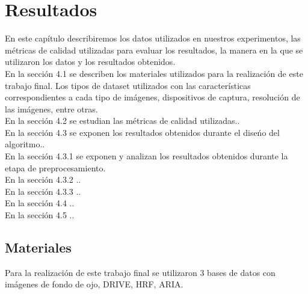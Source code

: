
\chapter{Resultados} %

En este cap\'itulo  describiremos los datos utilizados en 	nuestros experimentos, las m\'etricas de calidad utilizadas para evaluar los resultados, la manera en la que se  utilizaron los datos y los resultados obtenidos.\\

En la secci\'on  4.1 se describen los materiales utilizados para la realizaci\'on de este trabajo final. Los tipos de dataset utilizados con las caracter\'isticas correspondientes a cada tipo de im\'agenes, dispositivos de captura, resoluci\'on de las im\'agenes, entre otras.\\

En la secci\'on 4.2  se estudian las m\'etricas de calidad utilizadas..\\

En la secci\'on 4.3 se exponen los resultados obtenidos durante el dise\'no del algoritmo..\\

En la secci\'on 4.3.1 se exponen y analizan los resultados obtenidos durante la etapa de preprocesamiento. \\

En la secci\'on 4.3.2 ..\\

En la secci\'on 4.3.3 ..\\

En la secci\'on 4.4 ..\\

En la secci\'on 4.5 ..\\



\label{Chapter4} %


\section{Materiales}

Para la realizaci\'on de este trabajo final se utilizaron 3 bases de datos con im\'agenes de fondo de ojo, DRIVE, HRF, ARIA.\\

